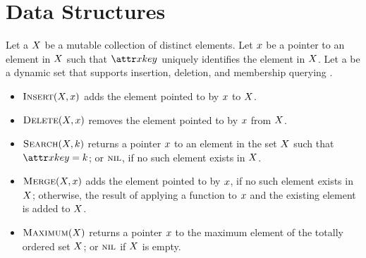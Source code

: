 \chapter{Data Structures}\label{ch:data-structures}

\newcommand{\vKey}{k}
\newcommand{\aSomeElementKey}{\aKey{\vSomeElement}}

Let a  $X$ be a mutable collection of distinct elements. Let $x$ be a pointer to an element in $X$ such that $\aSomeElementKey$ uniquely identifies the element in $X$. Let a  be a dynamic set that supports insertion, deletion, and membership querying \citep{Cormen2022}.
%
\begin{itemize}
  \item $\cInsert[\vSomeSet, \vSomeElement]$ adds the element pointed to by $x$ to $X$.
  \item $\cDelete[\vSomeSet, \vSomeElement]$ removes the element pointed to by $x$ from $X$.
  \item $\cSearch[\vSomeSet, \vKey]$ returns a pointer $x$ to an element in the set $X$ such that $\aSomeElementKey \equals \vKey$; or $\textsc{nil}$, if no such element exists in $X$.
  \item $\cMerge[\vSomeSet, \vSomeElement]$ adds the element pointed to by $x$, if no such element exists in $X$; otherwise, the result of applying a function to $x$ and the existing element is added to $X$.
  \item $\cMaximum[\vSomeSet]$ returns a pointer $x$ to the maximum element of the totally ordered set $X$; or $\textsc{nil}$ if $X$ is empty.
\end{itemize}